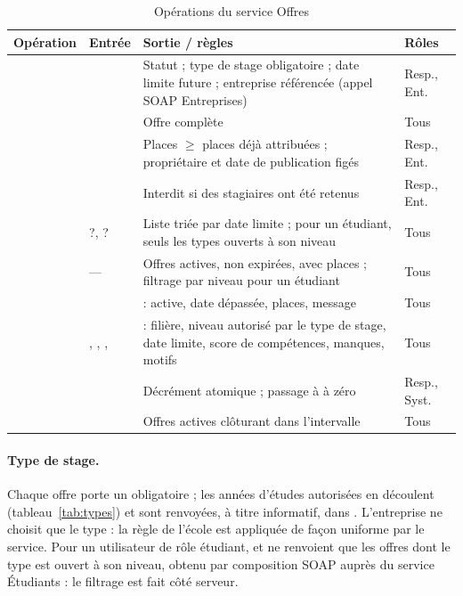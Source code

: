 \begin{table}[htbp]
\centering\small
\caption{Opérations du service Offres}
\begin{tabularx}{\textwidth}{@{}lYYl@{}}
\toprule
\textbf{Opération} & \textbf{Entrée} & \textbf{Sortie / règles} & \textbf{Rôles} \\
\midrule
{} &  & Statut  ; type de stage obligatoire ; date limite future ; entreprise référencée (appel SOAP Entreprises) & Resp., Ent.\footnotemark \\
 &  & Offre complète & Tous \\
 &  & Places $\geq$ places déjà attribuées ; propriétaire et date de publication figés & Resp., Ent. \\
 &  & Interdit si des stagiaires ont été retenus & Resp., Ent. \\
 & ?, ? & Liste triée par date limite ; pour un étudiant, seuls les types ouverts à son niveau & Tous \\
 & — & Offres actives, non expirées, avec places ; filtrage par niveau pour un étudiant & Tous \\
 &  &  : active, date dépassée, places, message & Tous \\
 & , , ,  &  : filière, niveau autorisé par le type de stage, date limite, score de compétences, manques, motifs & Tous \\
 &  & Décrément atomique ; passage à  à zéro & Resp., Syst. \\
 &  & Offres actives clôturant dans l'intervalle & Tous \\
\bottomrule
\end{tabularx}
\end{table}

\paragraph{Type de stage.} Chaque offre porte un  obligatoire ; les années d'études autorisées en
découlent (tableau~\ref{tab:types}) et sont renvoyées, à titre informatif, dans . L'entreprise ne
choisit que le type : la règle de l'école est appliquée de façon uniforme par le service. Pour un utilisateur de rôle
étudiant,  et  ne renvoient que les offres dont le type est ouvert à son
niveau, obtenu par composition SOAP auprès du service Étudiants : le filtrage est fait côté serveur.

